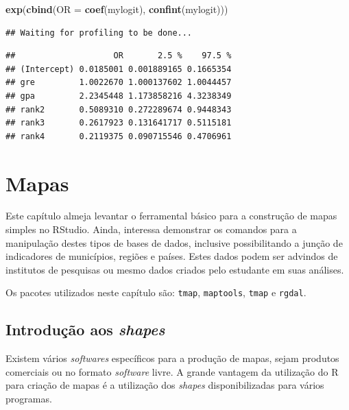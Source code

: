 \documentclass[12pt,brazil,]{book}
\newenvironment{Shaded}{\begin{snugshade}}{\end{snugshade}}
\newcommand{\DataTypeTok}[1]{\textcolor[rgb]{0.13,0.29,0.53}{#1}}
\newcommand{\KeywordTok}[1]{\textcolor[rgb]{0.13,0.29,0.53}{\textbf{#1}}}
\newcommand{\NormalTok}[1]{#1}
\begin{document}
\begin{Shaded}
\begin{Highlighting}[]
\KeywordTok{exp}\NormalTok{(}\KeywordTok{cbind}\NormalTok{(}\DataTypeTok{OR =} \KeywordTok{coef}\NormalTok{(mylogit), }\KeywordTok{confint}\NormalTok{(mylogit)))}
\end{Highlighting}
\end{Shaded}

\begin{verbatim}
## Waiting for profiling to be done...
\end{verbatim}

\begin{verbatim}
##                    OR       2.5 %    97.5 %
## (Intercept) 0.0185001 0.001889165 0.1665354
## gre         1.0022670 1.000137602 1.0044457
## gpa         2.2345448 1.173858216 4.3238349
## rank2       0.5089310 0.272289674 0.9448343
## rank3       0.2617923 0.131641717 0.5115181
## rank4       0.2119375 0.090715546 0.4706961
\end{verbatim}

\printbibliography[segment=\therefsegment,heading=subbibliography]

\hypertarget{mapas}{%
\chapter{Mapas}\label{mapas}}

Este capítulo almeja levantar o ferramental básico para a construção de
mapas simples no RStudio. Ainda, interessa demonstrar os comandos para a
manipulação destes tipos de bases de dados, inclusive possibilitando a
junção de indicadores de municípios, regiões e países. Estes dados podem
ser advindos de institutos de pesquisas ou mesmo dados criados pelo
estudante em suas análises.

Os pacotes utilizados neste capítulo são: \texttt{tmap},
\texttt{maptools}, \texttt{tmap} e \texttt{rgdal}.

\hypertarget{introducao-aos-shapes}{%
\section{\texorpdfstring{Introdução aos
\emph{shapes}}{Introdução aos shapes}}\label{introducao-aos-shapes}}

Existem vários \emph{softwares} específicos para a produção de mapas,
sejam produtos comerciais ou no formato \emph{software} livre. A grande
vantagem da utilização do R para criação de mapas é a utilização dos
\emph{shapes} disponibilizadas para vários programas.
\end{document}
